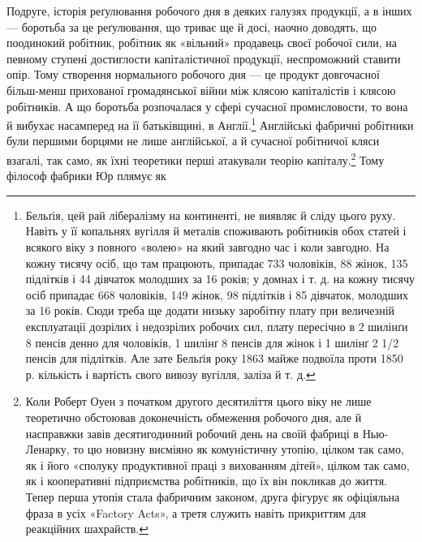Подруге, історія реґулювання робочого дня в деяких галузях
продукції, а в інших — боротьба за це реґулювання, що триває
ще й досі, наочно доводять, що поодинокий робітник, робітник як
«вільний» продавець своєї робочої сили, на певному ступені достиглости
капіталістичної продукції, неспроможний ставити опір.
Тому створення нормального робочого дня — це продукт довгочасної
більш-менш прихованої громадянської війни між клясою
капіталістів і клясою робітників. А що боротьба розпочалася
у сфері сучасної промисловости, то вона й вибухає насамперед
на її батьківщині, в Англії.\footnote{
Бельґія, цей рай лібералізму на континенті, не виявляє й сліду
цього руху. Навіть у її копальнях вугілля й металів споживають робітників
обох статей і всякого віку з повного «волею» на який завгодно час і
коли завгодно. На кожну тисячу осіб, що там працюють, припадає 733 чоловіків,
88 жінок, 135 підлітків і 44 дівчаток молодших за 16 років;
у домнах і т. д. на кожну тисячу осіб припадає 668 чоловіків, 149 жінок,
98 підлітків і 85 дівчаток, молодших за 16 років. Сюди треба ще додати
низьку заробітну плату при величезній експлуатації дозрілих і недозрілих
робочих сил, плату пересічно в 2 шилінґи 8 пенсів денно для чоловіків,
1 шилінґ 8 пенсів для жінок і 1 шилінґ 2 1/2 пенсів для підлітків.
Але зате Бельґія року 1863 майже подвоїла проти 1850 р. кількість і
вартість свого вивозу вугілля, заліза й т. д.
} Англійські фабричні робітники
були першими борцями не лише англійської, а й сучасної робітничої
кляси взагалі, так само, як їхні теоретики перші атакували
теорію капіталу.\footnote{
Коли Роберт Оуен з початком другого десятиліття цього віку не
лише теоретично обстоював доконечність обмеження робочого дня, але
й насправжки завів десятигодинний робочий день на своїй фабриці в
Нью-Ленарку, то цю новизну висміяно як комуністичну утопію, цілком
так само, як і його «сполуку продуктивної праці з вихованням дітей»,
цілком так само, як і кооперативні підприємства робітників, що їх він покликав
до життя. Тепер перша утопія стала фабричним законом, друга
фігурує як офіціяльна фраза в усіх «Factory Acts», а третя служить
навіть прикриттям для реакційних шахрайств.
} Тому філософ фабрики Юр плямує як
\parbreak{}  %
